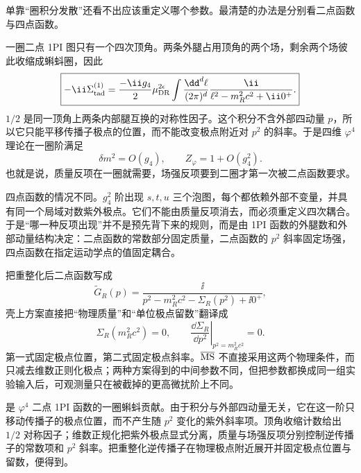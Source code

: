 \begin{exbox}
单靠“圈积分发散”还看不出应该重定义哪个参数。最清楚的办法是分别看二点函数与四点函数。

一圈二点 1PI 图只有一个四次顶角。两条外腿占用顶角的两个场，剩余两个场彼此收缩成蝌蚪圈，因此
\begin{equation}
 \boxed{
 -\ii\Sigma_{\rm tad}^{(1)}
 =\frac{-\ii g_4}{2}
 \mu_{\rm DR}^{2\epsilon}
 \int\frac{\dd^d \ell}{(2\pi)^d}
 \frac{\ii}{\ell^2-m_R^2c^2+\ii0^+}.}
 \label{eq:phi4-tadpole-selfenergy-dp52}
\end{equation}
$1/2$ 是同一顶角上两条内部腿互换的对称性因子。这个积分不含外部四动量 $p$，所以它只能平移传播子极点的位置，而不能改变极点附近对 $p^2$ 的斜率。于是四维 $\varphi^4$ 理论在一圈阶满足
\begin{equation}
 \boxed{
 \delta m^2=O(g_4),
 \qquad
 Z_\varphi=1+O(g_4^2).}
 \label{eq:phi4-one-loop-mass-vs-Z-dp52}
\end{equation}
也就是说，质量反项在一圈就需要，场强反项要到二圈才第一次被二点函数要求。

四点函数的情况不同。$g_4^2$ 阶出现 $s,t,u$ 三个泡图，每个都依赖外部不变量，并具有同一个局域对数紫外极点。它们不能由质量反项消去，而必须重定义四次耦合。于是“哪一种反项出现”并不是预先背下来的规则，而是由 1PI 函数的外腿数和外部动量结构决定：二点函数的常数部分固定质量，二点函数的 $p^2$ 斜率固定场强，四点函数在指定运动学点的值固定耦合。

把重整化后二点函数写成
\begin{equation}
 \widetilde G_R(p)
 =\frac{\ii}
 {p^2-m_R^2c^2-\Sigma_R(p^2)+\ii0^+},
 \label{eq:phi4-ren-propagator-dp52}
\end{equation}
壳上方案直接把“物理质量”和“单位极点留数”翻译成
\begin{equation}
 \boxed{
 \Sigma_R(m_R^2c^2)=0,
 \qquad
 \left.\frac{\dd\Sigma_R}{\dd p^2}\right|_{p^2=m_R^2c^2}=0.}
 \label{eq:phi4-onshell-ren-conditions-dp52}
\end{equation}
第一式固定极点位置，第二式固定极点斜率。$\overline{\rm MS}$ 不直接采用这两个物理条件，而只减去维数正则化极点；两种方案得到的中间参数不同，但把参数都换成同一组实验输入后，可观测量只在被截掉的更高微扰阶上不同。


\medskip

 是 $\varphi^4$ 二点 1PI 函数的一圈蝌蚪贡献。由于积分与外部四动量无关，它在这一阶只移动传播子的极点位置，而不产生随 $p^2$ 变化的紫外斜率项。顶角收缩计数给出 $1/2$ 对称因子；维数正规化把紫外极点显式分离，质量与场强反项分别控制逆传播子的常数项和 $p^2$ 斜率。把重整化逆传播子在物理极点附近展开并固定极点位置与留数，便得到。




\end{exbox}
